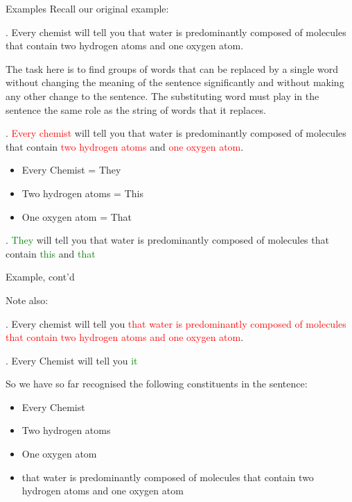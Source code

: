 \begin{frame}
  {Examples}
Recall our original example:

\ex.
Every chemist will tell you that water is predominantly composed of molecules that contain two hydrogen atoms and one oxygen atom.

The task here is to find groups of words that can be replaced by a single word without changing the meaning of the sentence significantly and without making any other change to the sentence.  The substituting word must play in the sentence the same role as the string of words that it replaces.

\end{frame}


\begin{frame}
  \ex.
\textcolor{red}{Every chemist} will tell you that water is predominantly composed of molecules that contain \textcolor{red}{two hydrogen atoms} and \textcolor{red}{one oxygen atom}.

\begin{itemize}
\item Every Chemist = They
\item Two hydrogen atoms = This
\item One oxygen atom = That
\end{itemize}

\ex.
\textcolor{green}{They}  will tell you that water is predominantly composed of molecules that contain \textcolor{green}{this} and \textcolor{green}{that} 


\end{frame}


\begin{frame}
{Example, cont'd}

Note also:

   \ex.
Every chemist will tell you \textcolor{red}{that water is predominantly composed of molecules that contain two hydrogen atoms and one oxygen atom}.

\ex. Every Chemist will tell you \textcolor{green}{it}



\end{frame}

\begin{frame}
  So we have so far recognised the following constituents in the sentence:

  \begin{itemize}
  \item Every Chemist
  \item Two hydrogen atoms
  \item One oxygen atom
  \item that water is predominantly composed of molecules that contain two hydrogen atoms and one oxygen atom
  \end{itemize}
\end{frame}


